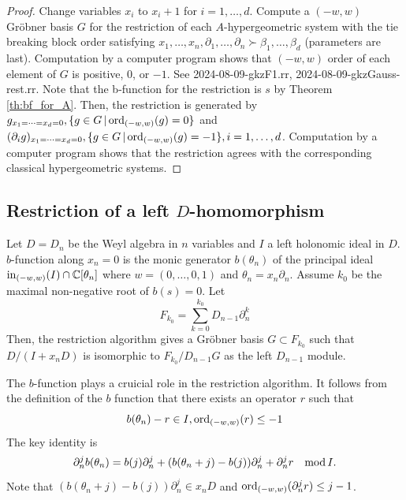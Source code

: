 \documentclass{article}
\def\CC{\mathbb{C}}
\def\memo#1{{\color{blue} #1}}
\def\pd#1{\partial_{#1}}
\begin{document}
\begin{proof}
Change variables $x_i$ to $x_i+1$ for $i=1, \ldots, d$.
Compute a $(-w,w)$ Gr\"obner basis $G$ for the restriction of 
each $A$-hypergeometric system with the tie breaking block order satisfying
$x_1, \ldots, x_n, \pd{1}, \ldots, \pd{n} \succ \beta_1, \ldots, \beta_d$
(parameters are last).
Computation by a computer program shows that $(-w,w)$ order of each element of $G$
is positive, $0$, or $-1$.
See \memo{2024-08-09-gkzF1.rr, 2024-08-09-gkzGauss-rest.rr}.
Note that the b-function for the restriction is $s$ by Theorem \ref{th:bf_for_A}.
Then, the restriction is generated by
$ g_{x_1=\cdots=x_d=0}, \{ g \in G\,|\, {\rm ord}_{(-w,w)}(g)=0\}$
and
$ (\pd{i} g)_{x_1=\cdots=x_d=0}, \{ g \in G\,|\, {\rm ord}_{(-w,w)}(g)=-1\},
i=1, \ldots, d$.
Computation by a computer program shows that the restriction agrees with
the corresponding classical hypergeometric systems.
\end{proof}


\subsection{Restriction of a left $D$-homomorphism}

Let $D=D_n$ be the Weyl algebra in $n$ variables and $I$ a left holonomic ideal in $D$.
$b$-function along $x_n=0$ is the monic generator $b(\theta_n)$ of
the principal ideal
$ {\rm in}_{(-w,w)} (I) \cap \CC[\theta_n]$
where $w=(0,\ldots, 0,1)$ and $\theta_n=x_n \pd{n}$.
Assume $k_0$ be the maximal non-negative root of $b(s)=0$.
Let 
\begin{equation}
 F_{k_0} = \sum_{k=0}^{k_0} D_{n-1} \pd{n}^k 
\end{equation}
Then, the restriction algorithm \cite{oaku-1997} gives a Gr\"obner basis $G \subset F_{k_0}$
such that 
$D/(I+x_n D)$ is isomorphic to 
$F_{k_0}/D_{n-1}G$ as the left $D_{n-1}$ module.

The $b$-function plays a cruicial role in the restriction algorithm.
It follows from the definition of the $b$ function that 
there exists an operator $r$ such that
$$
  b(\theta_n)- r \in I, {\rm ord}_{(-w,w)}(r) \leq -1
$$ 
The key identity is 
\begin{equation}  \label{eq:b-reduction}
 \pd{n}^j b(\theta_n) = b(j)\pd{n}^j + (b(\theta_n+j)-b(j))\pd{n}^j + \pd{n}^j r \quad {\rm mod}\, I.
\end{equation}
Note that 
$
(b(\theta_n+j)-b(j))\pd{n}^j \in x_n D
$
and
$ {\rm ord}_{(-w,w)} (\pd{n}^j r) \leq j-1
$.
\end{document}
